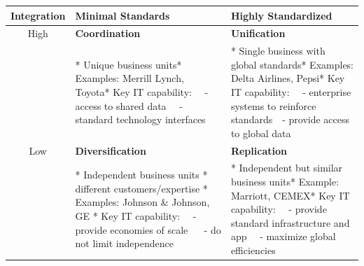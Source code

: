 \documentclass[]{book}
\begin{document}
\begin{longtable}[]{@{}cll@{}}
\toprule
\begin{minipage}[b]{0.14\columnwidth}\centering
Integration\strut
\end{minipage} & \begin{minipage}[b]{0.45\columnwidth}\raggedright
Minimal Standards\strut
\end{minipage} & \begin{minipage}[b]{0.32\columnwidth}\raggedright
Highly Standardized\strut
\end{minipage}\tabularnewline
\midrule
\endhead
\begin{minipage}[t]{0.14\columnwidth}\centering
High\strut
\end{minipage} & \begin{minipage}[t]{0.45\columnwidth}\raggedright
\textbf{Coordination}\strut
\end{minipage} & \begin{minipage}[t]{0.32\columnwidth}\raggedright
\textbf{Unification}\strut
\end{minipage}\tabularnewline
\begin{minipage}[t]{0.14\columnwidth}\centering
\strut
\end{minipage} & \begin{minipage}[t]{0.45\columnwidth}\raggedright
* Unique business units* Examples: Merrill Lynch, Toyota* Key IT capability:~~ - access to shared data~~ - standard technology interfaces\strut
\end{minipage} & \begin{minipage}[t]{0.32\columnwidth}\raggedright
* Single business with global standards* Examples: Delta Airlines, Pepsi* Key IT capability:~~ - enterprise systems to reinforce standards~~- provide access to global data\strut
\end{minipage}\tabularnewline
\begin{minipage}[t]{0.14\columnwidth}\centering
Low\strut
\end{minipage} & \begin{minipage}[t]{0.45\columnwidth}\raggedright
\textbf{Diversification}\strut
\end{minipage} & \begin{minipage}[t]{0.32\columnwidth}\raggedright
\textbf{Replication}\strut
\end{minipage}\tabularnewline
\begin{minipage}[t]{0.14\columnwidth}\centering
\strut
\end{minipage} & \begin{minipage}[t]{0.45\columnwidth}\raggedright
* Independent business units * different customers/expertise * Examples: Johnson \& Johnson, GE * Key IT capability:~~ - provide economies of scale ~~ - do not limit independence\strut
\end{minipage} & \begin{minipage}[t]{0.32\columnwidth}\raggedright
* Independent but similar business units* Example: Marriott, CEMEX* Key IT capability:~~ - provide standard infrastructure and app~~ - maximize global efficiencies\strut
\end{minipage}\tabularnewline
\bottomrule
\end{longtable}
\end{document}
